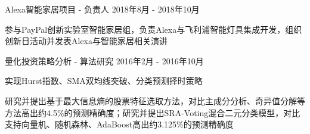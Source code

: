 \documentclass[11pt, a4paper, UTF8]{awesome-cv}
\begin{document}
%
\begin{cventries}
  \cventry
    {Alexa智能家居项目 - 负责人} %
    {} %
    {} %
    {2018年8月 - 2018年10月} %
    {
      \begin{cvitems} %
        \item {参与PayPal创新实验室智能家居组，负责Alexa与飞利浦智能灯具集成开发，组织创新日活动并发表Alexa与智能家居相关演讲}
      \end{cvitems}
    }

  \cventry
    {量化投资策略分析 - 算法研究} %
    {} %
    {} %
    {2016年2月 - 2016年10月} %
    {
      \begin{cvitems} %
        \item {实现Hurst指数、SMA双均线突破、分类预测择时策略}
        \item {研究并提出基于最大信息熵的股票特征选取方法，对比主成分分析、奇异值分解等方法高出约4.5\%的预测精确度；研究并提出SRA-Voting混合二元分类模型，对比支持向量机、随机森林、AdaBoost高出约3.125\%的预测精确度}
      \end{cvitems}
    }
    
    
\end{cventries}
\end{document}
